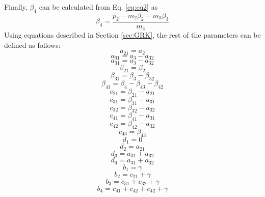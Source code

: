 \documentclass{ansconf}
\numberwithin{equation}{section}
\begin{document}
Finally, $\beta_4$ can be calculated from Eq. \eqref{eq:eq2} as
\begin{equation}
	\beta_4 = \frac{p_2 - m_2\beta_2 - m_3\beta_3}{m_4}
\end{equation}
Using equations described in Section \ref{sec:GRK}, the rest of the parameters can be defined as follows:
\begin{equation}
	a_{21} = a_2
\end{equation}
\begin{equation}
	a_{31} = a_3 - a_{32}
\end{equation}
\begin{equation}
	a_{31} = a_3 - a_{32}
\end{equation}
\begin{equation}
	\beta_{21} = \beta_2
\end{equation}
\begin{equation}
	\beta_{31} = \beta_3 - \beta_{32}
\end{equation}
\begin{equation}
	\beta_{41} = \beta_4 - \beta_{43} - \beta_{42}
\end{equation}
\begin{equation}
	c_{21} = \beta_{21} - a_{21}
\end{equation}
\begin{equation}
	c_{31} = \beta_{31} - a_{31}
\end{equation}
\begin{equation}
	c_{32} = \beta_{32} - a_{32}
\end{equation}
\begin{equation}
	c_{41} = \beta_{41} - a_{31}
\end{equation}
\begin{equation}
	c_{42} = \beta_{42} - a_{32}
\end{equation}
\begin{equation}
	c_{43} = \beta_{43}
\end{equation}
\begin{equation}
	d_1 = 0
\end{equation}
\begin{equation}
	d_2 = a_{21}
\end{equation}
\begin{equation}
	d_3 = a_{31} + a_{32}
\end{equation}
\begin{equation}
	d_4 = a_{31} + a_{32}
\end{equation}
\begin{equation}
	b_1 = \gamma
\end{equation}
\begin{equation}
	b_2 = c_{21} + \gamma
\end{equation}
\begin{equation}
	b_3 = c_{31} + c_{32} + \gamma
\end{equation}
\begin{equation}
	b_4 = c_{41} + c_{42} + c_{42} +\gamma
\end{equation}

\end{document}

